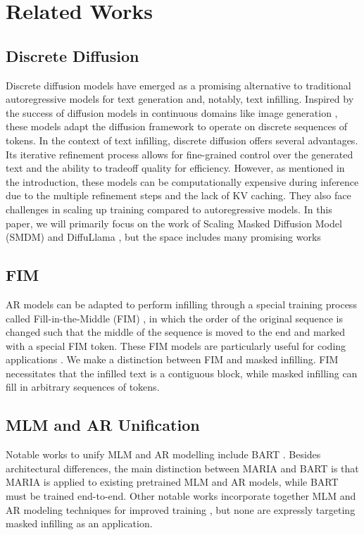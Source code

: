 \section{Related Works}
\subsection*{Discrete Diffusion}
Discrete diffusion models have emerged as a promising alternative to traditional autoregressive models for text generation and, notably, text infilling. Inspired by the success of diffusion models in continuous domains like image generation \cite{ho2020denoisingdiffusionprobabilisticmodels}, these models adapt the diffusion framework to operate on discrete sequences of tokens. In the context of text infilling, discrete diffusion offers several advantages. Its iterative refinement process allows for fine-grained control over the generated text and the ability to tradeoff quality for efficiency. However, as mentioned in the introduction, these models can be computationally expensive during inference due to the multiple refinement steps and the lack of KV caching.  They also face challenges in scaling up training compared to autoregressive models. In this paper, we will primarily focus on the work of Scaling Masked Diffusion Model (SMDM) \cite{nie2024scalingmaskeddiffusionmodels} and DiffuLlama \cite{gong2024scalingdiffusionlanguagemodels}, but the space includes many promising works \cite{sahoo2024simpleeffectivemaskeddiffusion, liu2024discrete, liu2024thinkgeneratediscretediffusion, hoogeboomardiffusion, ou2024absorbingdiscretediffusionsecretly}
\subsection*{FIM}
AR models can be adapted to perform infilling through a special training process called Fill-in-the-Middle (FIM) \cite{donahue2020enabling}, in which the order of the original sequence is changed such that the middle of the sequence is moved to the end and marked with a special FIM token. These FIM models are particularly useful for coding applications \cite{fried2023incodergenerativemodelcode}. We make a distinction between FIM and masked infilling. FIM necessitates that the infilled text is a contiguous block, while masked infilling can fill in arbitrary sequences of tokens.
\subsection*{MLM and AR Unification}
Notable works to unify MLM and AR modelling include BART \cite{lewis2019bart}. Besides architectural differences, the main distinction between MARIA and BART is that MARIA is applied to existing pretrained MLM and AR models, while BART must be trained end-to-end. Other notable works incorporate together MLM and AR modeling techniques for improved training \cite{du2022glmgenerallanguagemodel, nguyen2023meetmiddlenewpretraining, yu2024antlmbridgingcausalmasked}, but none are expressly targeting masked infilling as an application.